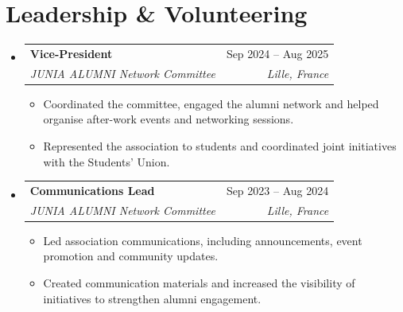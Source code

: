 \documentclass[a4paper,11pt]{article}
\makeatletter
\newcommand{\resumeItem}[1]{\item\small{{#1 \vspace{-1.5pt}}}}
\newcommand{\resumeSubheading}[4]{\vspace{1pt}\item
  \begin{tabular*}{0.97\textwidth}[t]{l@{\extracolsep{\fill}}r}
  {\color{primary}\textbf{#1}} & #2 \\
  \textit{\small#3} & \textit{\small #4} \\
  \end{tabular*}\vspace{-4pt}}
\newcommand{\resumeSubHeadingListStart}{\begin{itemize}[leftmargin=0.15in,label={}]}
\newcommand{\resumeSubHeadingListEnd}{\end{itemize}}
\newcommand{\resumeItemListStart}{\begin{itemize}[leftmargin=0.15in,label={\small\textbullet},itemsep=1.5pt,parsep=0pt,topsep=2pt,partopsep=0pt]}
\newcommand{\resumeItemListEnd}{\end{itemize}\vspace{-1pt}}
\makeatother
\begin{document}
\section{Leadership \& Volunteering}
\resumeSubHeadingListStart
\resumeSubheading{Vice-President}{Sep 2024 -- Aug 2025}{JUNIA ALUMNI Network Committee}{Lille, France}
\resumeItemListStart
  \resumeItem{Coordinated the committee, engaged the alumni network and helped organise after-work events and networking sessions.}
  \resumeItem{Represented the association to students and coordinated joint initiatives with the Students' Union.}
\resumeItemListEnd
\resumeSubheading{Communications Lead}{Sep 2023 -- Aug 2024}{JUNIA ALUMNI Network Committee}{Lille, France}
\resumeItemListStart
  \resumeItem{Led association communications, including announcements, event promotion and community updates.}
  \resumeItem{Created communication materials and increased the visibility of initiatives to strengthen alumni engagement.}
\resumeItemListEnd
\resumeSubHeadingListEnd
\end{document}
